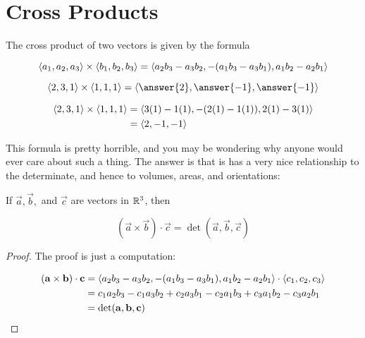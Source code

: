 \documentclass{ximera}
\begin{document}
\section{Cross Products}

\begin{definition}
  The cross product of two vectors is given by the formula
  
  \[
  \left\langle a_1,a_2,a_3\right\rangle \times \left\langle b_1,b_2,b_3\right\rangle = \left\langle a_2b_3-a_3b_2, -(a_1b_3-a_3b_1), a_1b_2-a_2b_1\right\rangle
  \]
\end{definition}		

\begin{question}
  \[
  \vector{2,3,1} \times \vector{1,1,1} = \vector{\answer{2},\answer{-1},\answer{-1}}
  \]
  
  \begin{hint}
    \begin{align*}
      \left\langle 2,3,1\right\rangle \times \left\langle 1,1,1\right\rangle &= \left\langle 3(1)-1(1),-(2(1)-1(1)), 2(1)-3(1)\right\rangle\\
      &=\left\langle 2,-1,-1\right\rangle
    \end{align*}
  \end{hint}
\end{question}

This formula is pretty horrible, and you may be wondering why anyone
would ever care about such a thing.  The answer is that is has a very
nice relationship to the determinate, and hence to volumes, areas, and
orientations:

\begin{theorem}
  If $\vec{a},\vec{b},$ and $\vec{c}$ are vectors in $\mathbb R^3$, then 
  
  \[
  (\vec{a} \times \vec{b}) \cdot \vec{c} = \det(\vec{a},\vec{b},\vec{c}) 
  \]
\end{theorem}

\begin{proof}
  
  The proof is just a computation:
  
  \begin{align*}
    (\mathbf{a} \times \mathbf{b}) \cdot \mathbf{c} &= \left\langle a_2b_3-a_3b_2, -(a_1b_3-a_3b_1), a_1b_2-a_2b_1\right\rangle \cdot \left\langle c_1,c_2,c_3\right\rangle\\
    &=c_1a_2b_3-c_1a_3b_2+c_2a_3b_1-c_2a_1b_3+c_3a_1b_2-c_3a_2b_1\\
    &=\det(\mathbf{a},\mathbf{b},\mathbf{c}) 
  \end{align*}
\end{proof}
\end{document}
